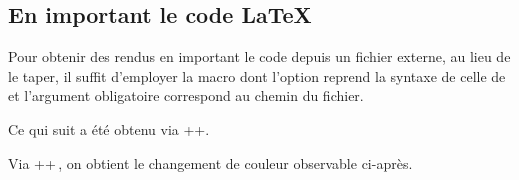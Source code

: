 \documentclass{tutodoc}
\begin{document}
\subsection{En important le code \LaTeX}

Pour obtenir des rendus en important le code depuis un fichier externe, au lieu de le taper, il suffit d'employer la macro  dont l'option reprend la syntaxe de celle de  et l'argument obligatoire correspond au chemin du fichier.


\begin{tdocexa}
    Ce qui suit a été obtenu via \tdocinlatex++.

    \medskip


    \medskip

    Via \tdocinlatex++\,, on obtient le changement de couleur observable ci-après.

    \medskip

\end{tdocexa}
\end{document}
